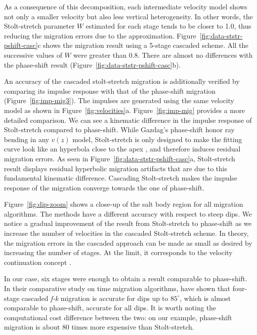 \par
As a consequence of this decomposition, each intermediate velocity
model shows not only a smaller velocity but also less vertical
heterogeneity. In other words, the Stolt-stretch parameter $W$
estimated for each stage tends to be closer to 1.0, thus reducing the
migration errors due to the
approximation. Figure~\ref{fig:data-ststr-pshift-casc}c shows the
migration result using a 5-stage cascaded scheme. All the successive
values of $W$ were greater than 0.8. There are almost no
differences with the phase-shift result
(Figure~\ref{fig:data-ststr-pshift-casc}b).
\par
{}
An accuracy of the cascaded stolt-stretch migration is additionally
verified by comparing its impulse response with that of the
phase-shift migration (Figure~\ref{fig:imp-mig3}). The impulses are
generated using the same velocity model as shown in
Figure~\ref{fig:velocities}a.  Figure~\ref{fig:imp-mig} provides a
more detailed comparison. We can see a kinematic difference in the
impulse response of Stolt-stretch compared to phase-shift.  While
Gazdag's phase-shift honor ray bending in any $v(z)$ model,
Stolt-stretch is only designed to make the fitting curve look like an
hyperbola close to the apex \cite[]{Levin.sep.35.195}, and therefore
induces residual migration errors.  As seen in
Figure~\ref{fig:data-ststr-pshift-casc}a, Stolt-stretch result
displays residual hyperbolic migration artifacts that are due to this
fundamental kinematic difference. Cascading Stolt-stretch makes the
impulse response of the migration converge towards the one of
phase-shift.

Figure~\ref{fig:dip-zoom} shows a close-up of the salt body region for
all migration algorithms. The methods have a different accuracy with
respect to steep dips. We notice a gradual improvement of the result
from Stolt-stretch to phase-shift as we increase the number of
velocities in the cascaded Stolt-stretch scheme. In theory, the
migration errors in the cascaded approach can be made as small as
desired by increasing the number of stages. At the limit, it
corresponds to the velocity continuation concept
\cite[]{me,SEG-1997-1762}.
\par
In our case, six stages were enough to obtain a result comparable to
phase-shift. In their comparative study on time migration algorithms,
\cite{GEO54-06-07010717} have shown that four-stage cascaded {\it
  f-k} migration is accurate for dips up to $85^\circ$, which is
almost comparable to phase-shift, accurate for all dips.  It is worth
noting the computational cost difference between the two: on our
example, phase-shift migration is about 80 times more expensive than
Stolt-stretch.

